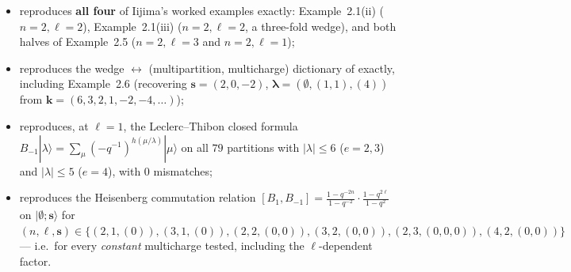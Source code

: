 \documentclass[11pt]{article}
\theoremstyle{definition}
\newcommand{\bs}{\mathbf{s}}
\newcommand{\blam}{\boldsymbol{\lambda}}
\newcommand{\bemp}{\boldsymbol{\emptyset}}
\newcommand{\Bmi}{B_{-1}}
\begin{document}
\begin{itemize}
\item reproduces \textbf{all four} of Iijima's worked examples exactly:
  Example~2.1(ii) ($n=2,\ell=2$), Example~2.1(iii) ($n=2,\ell=2$, a
  three-fold wedge), and both halves of Example~2.5 ($n=2,\ell=3$ and
  $n=2,\ell=1$);
\item reproduces the wedge $\leftrightarrow$ (multipartition, multicharge)
  dictionary of \cite[\S2.3]{Iijima2012} exactly, including Example~2.6
  (recovering $\bs = (2,0,-2)$, $\blam = (\emptyset,(1,1),(4))$ from
  $\mathbf k = (6,3,2,1,-2,-4,\dots)$);
\item reproduces, at $\ell = 1$, the Leclerc--Thibon closed formula
  $\Bmi|\lambda\rangle = \sum_\mu (-q^{-1})^{h(\mu/\lambda)}|\mu\rangle$
  on all $79$ partitions with $|\lambda| \le 6$ ($e = 2,3$) and
  $|\lambda| \le 5$ ($e=4$), with $0$ mismatches;
\item reproduces the Heisenberg commutation relation
  $[B_1,B_{-1}] = \frac{1-q^{-2n}}{1-q^{-2}}\cdot\frac{1-q^{2\ell}}{1-q^{2}}$
  \cite[\S2.5]{Iijima2012} on $|\bemp;\bs\rangle$ for
  $(n,\ell,\bs) \in \{(2,1,(0)), (3,1,(0)), (2,2,(0,0)), (3,2,(0,0)),
  (2,3,(0,0,0)), (4,2,(0,0))\}$ --- i.e.\ for every \emph{constant}
  multicharge tested, including the $\ell$-dependent factor.
\end{itemize}
\end{document}
